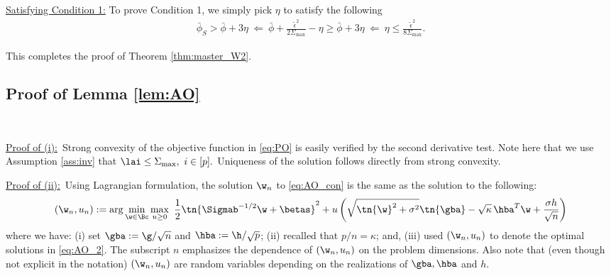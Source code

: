 \vspace{5pt}
\noindent\underline{Satisfying Condition 1:} To prove Condition 1, we simply pick $\eta$ to satisfy the following
\begin{align}
\bar\phi_S > \bar\phi + 3 \eta ~\Leftarrow~ \bar\phi + \frac{\tilde\epsilon^2}{2\Sigma_{\max}} - \eta \geq \bar\phi + 3 \eta ~\Leftarrow~ \eta \leq \frac{\tilde\epsilon^2}{8\Sigma_{\max}}.
\end{align}


This completes the proof of Theorem \ref{thm:master_W2}.

\subsection{Proof of Lemma \ref{lem:AO}}\label{sec:proofAO}

~~~~
~~~~

\vp
\noindent\underline{Proof of (i):}~Strong convexity of the objective function in \eqref{eq:PO} is easily verified by the second derivative test. Note here that we use Assumption \ref{ass:inv} that $\lai\leq\Sigma_{\max},~i\in[p].$ Uniqueness of the solution follows directly from strong convexity. 



\vspace{5pt}
\noindent\underline{Proof of (ii):}~Using Lagrangian formulation, the solution $\w_n$ to \eqref{eq:AO_con} is the same as the solution to the following:
\begin{align}
\left(\w_n,u_n\right) :=\arg\min_{\w\in\Bc}\max_{u\geq 0} ~\frac{1}{2}\tn{\Sigmab^{-1/2}\w+\betas}^2 + u \left( \sqrt{\tn{\w}^2+\sigma^2} \tn{\gba} - \sqrt{\kappa}\,{\hba}^T\w + \frac{\sigma h}{\sqrt{n}} \right)\label{eq:AO_2}
\end{align}
where we have: (i) set $\gba := \g/\sqrt{n}$ and $\hba:= \h/\sqrt{p}$; (ii) recalled that $p/n=\kappa$; and, (iii) used $\left(\w_n,u_n\right)$ to denote the optimal solutions in \eqref{eq:AO_2}. The subscript $n$ emphasizes the dependence of $\left(\w_n,u_n\right)$ on the problem dimensions. Also note that (even though not explicit in the notation) $\left(\w_n,u_n\right)$ are random variables depending on the realizations of $\gba,\hba$ and $h$.

